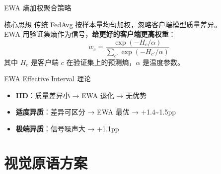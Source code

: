 \documentclass[aspectratio=169, 10pt]{beamer}
\begin{document}
\begin{frame}{EWA 熵加权聚合策略}
  \begin{block}{核心思想}
    传统 FedAvg 按样本量均匀加权，忽略客户端模型质量差异。\\
    EWA 用验证集熵作为信号，\textbf{给更好的客户端更高权重}：
    \[
      w_c = \frac{\exp(-H_c / \alpha)}{\sum_{c'} \exp(-H_{c'} / \alpha)}
    \]
    其中 $H_c$ 是客户端 $c$ 在验证集上的预测熵，$\alpha$ 是温度参数。
  \end{block}
  \vspace{0em}
  \begin{block}{EWA Effective Interval 理论}
    \begin{itemize}
      \item \textbf{IID}：质量差异小 → EWA 退化 → \alert{无优势}
      \item \textbf{适度异质}：差异可区分 → EWA 最优 → \alert{+1.4\textasciitilde 1.5pp}
      \item \textbf{极端异质}：信号噪声大 → \alert{+1.1pp}
    \end{itemize}
  \end{block}
\end{frame}

\section{视觉原语方案}
\end{document}
